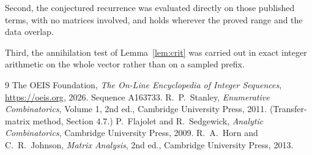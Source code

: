 \documentclass[11pt,a4paper]{article}
\theoremstyle{plain}
\theoremstyle{definition}
\begin{document}
Second, the conjectured recurrence was evaluated directly on those published terms, with no
matrices involved, and holds wherever the proved range and the data overlap.

Third, the annihilation test of Lemma~\ref{lem:crit} was carried out in exact integer
arithmetic on the whole vector rather than on a sampled prefix.

\begin{thebibliography}{9}
 The OEIS Foundation, \emph{The On-Line Encyclopedia of Integer
Sequences}, \url{https://oeis.org}, 2026. Sequence A163733.
 R.~P.~Stanley, \emph{Enumerative Combinatorics}, Volume 1, 2nd ed.,
Cambridge University Press, 2011. (Transfer-matrix method, Section 4.7.)
 P.~Flajolet and R.~Sedgewick, \emph{Analytic Combinatorics}, Cambridge
University Press, 2009.
 R.~A.~Horn and C.~R.~Johnson, \emph{Matrix Analysis}, 2nd ed., Cambridge
University Press, 2013.
\end{thebibliography}
\end{document}
